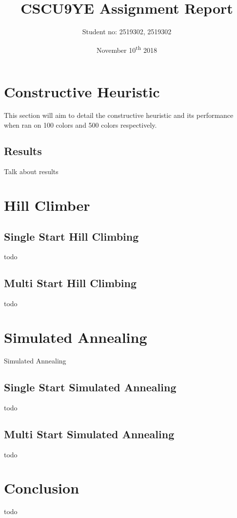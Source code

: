 \documentclass[11pt, a4paper]{report}
\title{CSCU9YE Assignment Report}
\author{Student no: 2519302, 2519302}
\date{November 10\textsuperscript{th} 2018}
\begin{document}
\begin{titlepage}
\maketitle
\end{titlepage}
\doublespacing
{}
\tableofcontents
\newpage
\singlespacing

\section*{Constructive Heuristic}
This section will aim to detail the constructive heuristic and its performance when ran on 100 colors and 500 colors respectively.

\subsection*{Results}
Talk about results

\section*{Hill Climber}
\subsection*{Single Start Hill Climbing}
todo

\subsection*{Multi Start Hill Climbing}
todo

\section*{Simulated Annealing}


Simulated Annealing 

\subsection*{Single Start Simulated Annealing}
todo

\subsection*{Multi Start Simulated Annealing}
todo

\section*{Conclusion}
todo
\end{document}
